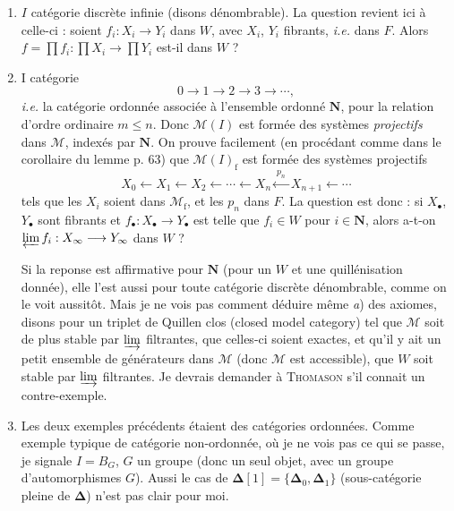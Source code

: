 \documentclass[11pt]{article}
\newcommand{\printedpage}[1]{\marginpar{\footnotesize p.~#1}}
\newcommand{\msp}[1]{\marginpar{\footnotesize [#1]}}
\newcommand{\M}{\mathcal{M}}
\newcommand{\rf}{\mathrm{f}}
\begin{document}
\begin{enumerate}
\item[\textit{a})] $I$ catégorie discrète infinie (disons dénombrable). La question revient ici à celle-ci : soient $f_i : X_i \longrightarrow Y_i$ dans $W$, avec $X_i$, $Y_i$ fibrants, \textit{i.e.} dans $F$. Alors $f = \prod f_i : \prod X_i \longrightarrow \prod Y_i$ est-il dans $W$ ?

\msp{page 73}

\item[\textit{b})] I catégorie %
\[
0 \longrightarrow 1 \longrightarrow 2 \longrightarrow 3 \longrightarrow \cdots,
\]
\textit{i.e.} la catégorie ordonnée associée à l'ensemble ordonné $\mathbf{N}$, pour la relation d'ordre ordinaire $m \leq n$. Donc $\M(I)$ est formée des systèmes \textit{projectifs} dans $\M$, indexés par $\mathbf{N}$. On prouve facilement (en procédant comme dans le corollaire du lemme p. 63) que $\M(I)_{\rf}$ est formée des systèmes projectifs
\[
X_0 \longleftarrow X_1 \longleftarrow X_2 \longleftarrow \cdots \longleftarrow X_n \xleftarrow{\ p_n\ } X_{n+1} \longleftarrow \cdots
\]
tels que les $X_i$ soient dans $\M_{\rf}$, et les $p_n$ dans $F$. La question est donc : si $X_\bullet$, $Y_\bullet$ sont fibrants et $f_\bullet : X_\bullet \longrightarrow Y_\bullet$ est telle que $f_i \in W$ pour $i \in \mathbf{N}$, alors a-t-on $\varprojlim f_i : X_\infty \longrightarrow Y_\infty$ dans $W$ ?

Si la reponse est affirmative pour $\mathbf{N}$ (pour un $W$ et une quillénisation donnée), elle %
l'est aussi pour toute catégorie discrète dénombrable, comme on le voit aussitôt. Mais je ne vois pas comment déduire même \textit{a}) des axiomes, disons pour un triplet de Quillen clos (closed model category) tel que $\M$ soit de plus stable par $\varinjlim$ filtrantes, que celles-ci soient exactes, et qu'il y ait
\printedpage{41}
\msp{page 74}
un petit ensemble de générateurs dans $\M$ (donc $\M$ est accessible), que $W$ soit stable par $\varinjlim$ filtrantes. Je devrais demander à \textsc{Thomason} s'il connait un contre-exemple. %

\item[\textit{c})] Les deux exemples précédents étaient des catégories ordonnées. Comme exemple typique de catégorie non-ordonnée, où je ne vois pas ce qui se passe, je signale $I = B_G$, $G$ un groupe (donc un seul objet, avec un groupe d'automorphismes $G$). Aussi le cas de $\boldsymbol{\Delta}[1] = \{\boldsymbol{\Delta}_0, \boldsymbol{\Delta}_1\}$ (sous-catégorie pleine de $\boldsymbol{\Delta}$) n'est pas clair pour moi.
\end{enumerate}
\end{document}
